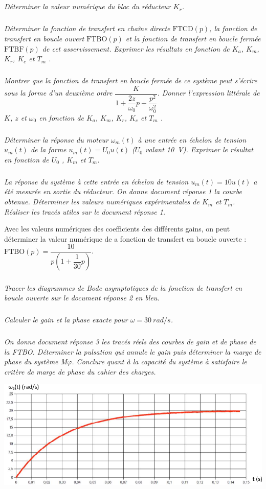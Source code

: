 \documentclass[10pt,fleqn]{article} %
\begin{document}
\begin{multicols}{2}
\subparagraph{}\textit{Déterminer la valeur numérique du bloc du réducteur $K_r$. }


\subparagraph{}\textit{Déterminer la fonction de transfert en chaîne directe $\text{FTCD}(p)$, la fonction de transfert en boucle ouvert $\text{FTBO}(p)$ et la fonction de transfert en boucle fermée $\text{FTBF}(p)$ de cet asservissement. Exprimer les résultats en fonction de $K_a$, $K_m$, $K_r$, $K_c$ et $T_m$ . }


\subparagraph{}\textit{Montrer que la fonction de transfert en boucle fermée de ce système peut s'écrire sous la forme d'un deuxième ordre $\dfrac{K}{1+\dfrac{2z}{\omega_0}p+\dfrac{p^2}{\omega_0^2}}$. Donner l’expression littérale de $K$, $z$ et $\omega_0$ en fonction de $K_a$, $K_m$, $K_r$, $K_c$ et $T_m$ . }


\subparagraph{}\textit{Déterminer la réponse du moteur $\omega_m (t)$ à une entrée en échelon de tension $u_m (t)$ de la forme $u_m (t)  = U_0 u(t)$ ($U_0$ valant \SI{10}{V}). Exprimer le résultat en fonction de $U_0$ , $K_m$ et $T_m$. }


\subparagraph{}\textit{La réponse du système à cette entrée en échelon de tension $u_m (t) =10u(t)$ a été mesurée en sortie du réducteur. On donne document réponse 1 la courbe obtenue. Déterminer les valeurs numériques expérimentales de $K_m$ et $T_m$. Réaliser les tracés utiles sur le document réponse 1.}

Avec les valeurs numériques des coefficients des différents gains, on peut déterminer la valeur numérique de a fonction de transfert en boucle ouverte : $\text{FTBO}(p)=\dfrac{10}{p\left(1+\dfrac{1}{30}p\right)}$.

\subparagraph{}\textit{Tracer les diagrammes de Bode asymptotiques de la fonction de transfert en boucle ouverte sur le document réponse 2 en bleu. }


\subparagraph{}\textit{Calculer le gain et la phase exacte pour $\omega = \SI{30}{rad/s}$.}


\subparagraph{}\textit{On donne document réponse 3 les tracés réels des courbes de gain et de phase de la FTBO. Déterminer la pulsation qui annule le gain puis déterminer la marge de phase du système M$\varphi$. Conclure quant à la capacité du système à satisfaire le critère de marge de phase du cahier des charges. }

\begin{center}
\includegraphics[width=\linewidth]{images/fig_05}
\end{center}


\end{multicols}
\end{document}
